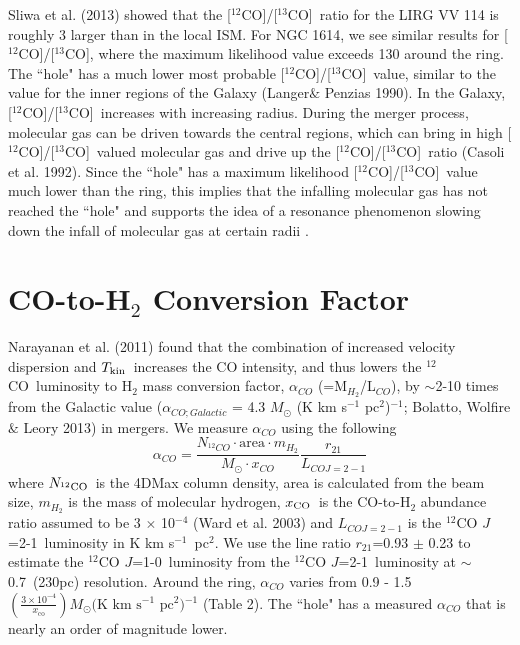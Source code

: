 \documentclass[preprint, 11pt]{aastex}
\newcommand{\co}{$^{12}$CO}
\newcommand{\coone}{$^{12}$CO $J$=1-0}
\newcommand{\cotwo}{$^{12}$CO $J$=2-1}
\newcommand{\kms}{km s$^{-1}$}
\newcommand{\tkin}{$T_{\rm{kin}}$}
\newcommand{\alphaco}{$M_{\odot}$ (K km s$^{-1}$ pc$^{2}$)$^{-1}$}
\newcommand{\nco}{$N_{\rm{^{12}CO}}$}
\newcommand{\xco}{[$^{12}$CO]/[$^{13}$CO]}
\newcommand{\xh}{$x_{\rm{CO}}$}
\begin{document}

Sliwa et al. (2013) showed that the \xco\ ratio for the LIRG VV 114 is roughly 3 larger than in the local ISM. For NGC 1614, we see similar results for \xco, where the maximum likelihood value exceeds 130 around the ring. The ``hole" has a much lower most probable \xco\ value, similar to the value for the inner regions of the Galaxy (Langer$\&$ Penzias 1990)\nocite{Langer1990}. In the Galaxy, \xco\ increases with increasing radius. During the merger process, molecular gas can be driven towards the central regions, which can bring in high \xco\ valued molecular gas and drive up the \xco\ ratio (Casoli et al. 1992)\nocite{Casoli1992}. Since the ``hole" has a maximum likelihood \xco\ value much lower than the ring, this implies that the infalling molecular gas has not reached the ``hole" and supports the idea of a resonance phenomenon slowing down the infall of molecular gas at certain radii \citep{Konig2013}. 

\section{CO-to-H$_{2}$ Conversion Factor}

Narayanan et al. (2011)\nocite{Narayanan2011} found that the combination of increased velocity dispersion and \tkin\ increases the CO intensity, and thus lowers the \co\ luminosity to H$_{2}$ mass conversion factor, $\alpha_{CO}$ (=M$_{H_{2}}$/L$_{CO}$), by $\sim$2-10 times from the Galactic value ($\alpha_{CO;Galactic}$ = 4.3 \alphaco; Bolatto, Wolfire $\&$ Leory 2013)\nocite{Bolatto2013} in mergers. 
We measure $\alpha_{CO}$ using the following
\begin{equation}
\alpha_{CO} = \frac{N_{^{12}CO}\cdot\textrm{area}\cdot m_{H_{2}}}{M_{\odot}\cdot x_{CO}} \frac{r_{21}}{L_{CO J=2-1}}
\end{equation}
where \nco\ is the 4DMax column density, area is calculated from the beam size, $m_{H_{2}}$ is the mass of molecular hydrogen, \xh\ is the CO-to-H$_{2}$ abundance ratio assumed to be 3 $\times$ 10$^{-4}$ (Ward et al. 2003)\nocite{Ward2003} and $L_{CO J=2-1}$ is the \cotwo\ luminosity in K \kms\ pc$^{2}$. We use the line ratio $r_{21}$=0.93 $\pm$ 0.23 to estimate the \coone\ luminosity from the \cotwo\ luminosity at $\sim$0.7\arcsec\ (230pc) resolution. Around the ring, $\alpha_{CO}$ varies from 0.9 - 1.5 $(\frac{3 \times 10^{-4}}{x_{\mathrm{co}}}) \textrm{$M_{\odot}$(K km s$^{-1}$ pc$^{2}$)$^{-1}$}$ (Table 2). The ``hole" has a measured $\alpha_{CO}$ that is nearly an order of magnitude lower.
\end{document}
